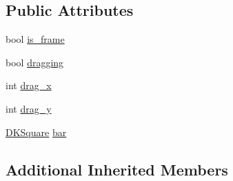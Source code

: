 \subsection*{Public Attributes}
\begin{DoxyCompactItemize}
\item 
bool \hyperlink{class_d_k_window_a11d05eb7b6f266118231fa6c502d56d4}{is\-\_\-frame}
\item 
bool \hyperlink{class_d_k_window_a9c3b07e8f9e9f7b5a2fdfeb5413190b6}{dragging}
\item 
int \hyperlink{class_d_k_window_a7ab30185d7d22f7caea63b8f84e0e6b1}{drag\-\_\-x}
\item 
int \hyperlink{class_d_k_window_a40f644b725e4169a5efc17ec3345ca73}{drag\-\_\-y}
\item 
\hyperlink{class_d_k_square}{D\-K\-Square} \hyperlink{class_d_k_window_a89bde6d6cdc0d740daf6c4b5967f9b5f}{bar}
\end{DoxyCompactItemize}
\subsection*{Additional Inherited Members}



